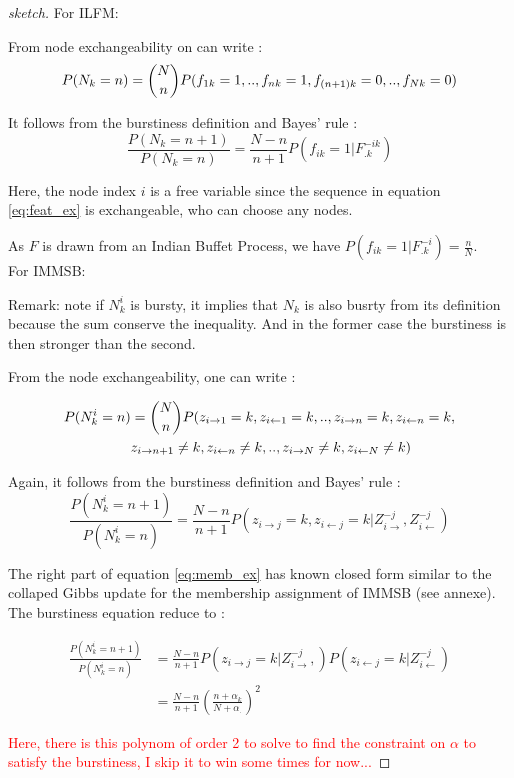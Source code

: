 \begin{proof}[sketch]
	
For ILFM:

From node exchangeability on can write :
\begin{equation} \label{eq:feat_ex}
P(N_k=n) = \dbinom{N}{n}P(f_{1k}=1,..,f_{nk}=1,f_{(n+1)k}=0,..,f_{Nk}=0)
\end{equation}

It follows from the burstiness definition and Bayes' rule :
\begin{equation}
\frac{P(N_k=n+1)}{P(N_k=n)} = \frac{N-n}{n+1}P(f_{ik}=1 | F_{.k}^{-ik})
\end{equation} 

Here, the node index $i$ is a free variable since the sequence in equation \eqref{eq:feat_ex} is exchangeable, who can choose any nodes.

As $F$ is drawn from an Indian Buffet Process, we have $P(f_{ik}=1 | F_{.k}^{-i}) = \frac{n}{N}$.\\


For IMMSB: 

Remark: note if $N_k^i$ is bursty, it implies that $N_k$ is also busrty from its definition because the sum conserve the inequality. And in the former case the burstiness is then stronger than the second.

From the node exchangeability, one can write :

\begin{align*}
P(N_k^i=n) &= \dbinom{N}{n}P(z_{i\rightarrow 1}=k,z_{i\leftarrow 1}=k,..,z_{i\rightarrow n}=k, z_{i\leftarrow n}=k, \\
 &z_{i\rightarrow n+1}\neq k, z_{i\leftarrow n}\neq k,..,  z_{i\rightarrow N}\neq k, z_{i\leftarrow N}\neq k)
\end{align*}

Again, it follows from the burstiness definition and Bayes' rule :
\begin{equation} \label{eq:memb_ex}
\frac{P(N_k^i=n+1)}{P(N_k^i=n)} = \frac{N-n}{n+1}P(z_{i\rightarrow j}=k,z_{i\leftarrow j}=k | Z_{i\rightarrow}^{-j}, Z_{i\leftarrow}^{-j})	
\end{equation}

The right part of equation \eqref{eq:memb_ex} has known closed form similar to the collaped Gibbs update for the membership assignment of IMMSB (see annexe). The burstiness equation reduce to :

\begin{align*}
\frac{P(N_k^i=n+1)}{P(N_k^i=n)} &= \frac{N-n}{n+1}P(z_{i\rightarrow j}=k | Z_{i\rightarrow}^{-j},) P(z_{i\leftarrow j}=k |  Z_{i\leftarrow}^{-j}) \\
&=  \frac{N-n}{n+1} \left( \frac{n + \alpha_k}{N + \alpha_{\bm{.}}}\right)^2
\end{align*}

\textcolor{red}{Here, there is this polynom of order 2 to solve to find the constraint on $\alpha$ to satisfy the burstiness, I skip it to win some times for now...}

\end{proof}


